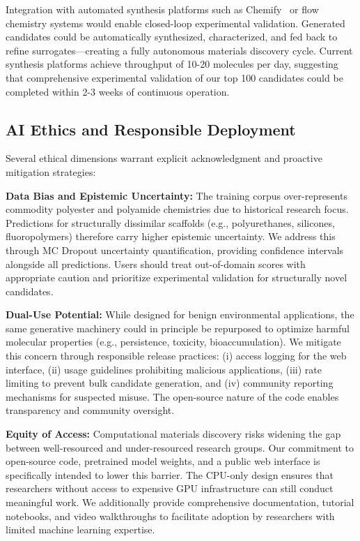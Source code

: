 \documentclass[twocolumn,10pt]{article}
\begin{document}
Integration with automated synthesis platforms such as Chemify~\cite{mehr2020chemify} or flow chemistry systems would enable closed-loop experimental validation. Generated candidates could be automatically synthesized, characterized, and fed back to refine surrogates—creating a fully autonomous materials discovery cycle. Current synthesis platforms achieve throughput of 10-20 molecules per day, suggesting that comprehensive experimental validation of our top 100 candidates could be completed within 2-3 weeks of continuous operation.

\subsection{AI Ethics and Responsible Deployment}

Several ethical dimensions warrant explicit acknowledgment and proactive mitigation strategies:

\textbf{Data Bias and Epistemic Uncertainty:} The training corpus over-represents commodity polyester and polyamide chemistries due to historical research focus. Predictions for structurally dissimilar scaffolds (e.g., polyurethanes, silicones, fluoropolymers) therefore carry higher epistemic uncertainty. We address this through MC Dropout uncertainty quantification, providing confidence intervals alongside all predictions. Users should treat out-of-domain scores with appropriate caution and prioritize experimental validation for structurally novel candidates.

\textbf{Dual-Use Potential:} While designed for benign environmental applications, the same generative machinery could in principle be repurposed to optimize harmful molecular properties (e.g., persistence, toxicity, bioaccumulation). We mitigate this concern through responsible release practices: (i) access logging for the web interface, (ii) usage guidelines prohibiting malicious applications, (iii) rate limiting to prevent bulk candidate generation, and (iv) community reporting mechanisms for suspected misuse. The open-source nature of the code enables transparency and community oversight.

\textbf{Equity of Access:} Computational materials discovery risks widening the gap between well-resourced and under-resourced research groups. Our commitment to open-source code, pretrained model weights, and a public web interface is specifically intended to lower this barrier. The CPU-only design ensures that researchers without access to expensive GPU infrastructure can still conduct meaningful work. We additionally provide comprehensive documentation, tutorial notebooks, and video walkthroughs to facilitate adoption by researchers with limited machine learning expertise.
\end{document}
